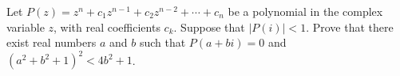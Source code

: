 Let $P(z)= z^n + c_1 z^{n-1} + c_2 z^{n-2} + \cdots + c_n$ be a polynomial in the complex variable $z$,  with real coefficients $c_k$. Suppose that $|P(i)| < 1$. Prove that there exist real numbers $a$ and $b$ such that $P(a + bi) = 0$ and $(a^2 + b^2 + 1)^2 < 4 b^2 + 1$.